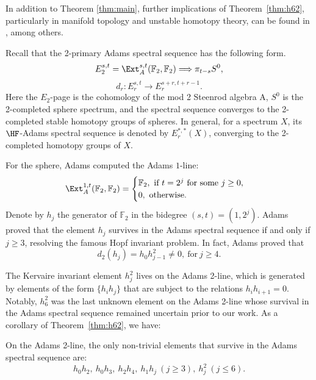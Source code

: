 In addition to Theorem \ref{thm:main}, further implications of Theorem~\ref{thm:h62}, particularly in manifold topology and unstable homotopy theory, can be found in \cite{MillerHHR, MahowaldRemark, HHR, BJMinduction}, among others. 


Recall that the 2-primary Adams spectral sequence has the following form.
$$E_2^{s,t} = \Ext^{s, t}_A(\mathbb{F}_2, \mathbb{F}_2) \Longrightarrow \pi_{t-s} {S^0},$$
$$d_r: E_r^{s,t} \longrightarrow E_r^{s+r, t+r-1}.$$
Here the $E_2$-page is the cohomology of the mod 2 Steenrod algebra A, $S^0$ is the 2-completed sphere spectrum, and the spectral sequence converges to the 2-completed stable homotopy groups of spheres. In general, for a spectrum $X$, its $\HF$-Adams spectral sequence is denoted by $E_r^{*,*}(X)$, converging to the 2-completed homotopy groups of $X$.

For the sphere, Adams \cite{Adams58} computed the Adams $1$-line: 
$$\Ext^{1,t}_A(\mathbb{F}_2, \mathbb{F}_2) = \begin{cases}
 	\mathbb{F}_2, \ \text{if} \ t = 2^j \ \text{for some} \ j \geq 0, \\
 	0, \ \text{otherwise}.
\end{cases}
$$
Denote by $h_j$ the generator of $\mathbb{F}_2$ in the bidegree $(s, t)=(1, 2^j)$. Adams \cite{Adams60} proved that the element $h_j$ survives in the Adams spectral sequence if and only if $j \geq 3$, resolving the famous Hopf invariant problem. In fact, Adams proved that
$$d_2(h_j) = h_0h_{j-1}^2 \neq 0, \ \text{for} \ j \geq 4.$$

The Kervaire invariant element $h_j^2$ lives on the Adams 2-line, which is generated by elements of the form $\{h_ih_j\}$ that are subject to the relations $h_ih_{i+1} = 0$. Notably, $h_6^2$ was the last unknown element on the Adams 2-line whose survival in the Adams spectral sequence remained uncertain prior to our work. As a corollary of Theorem~\ref{thm:h62}, we have:

\begin{corollary} \label{cor:2line}
    On the Adams 2-line, the only non-trivial elements that survive in the Adams spectral sequence are:
    $$h_0h_2, \ h_0h_3, \ h_2h_4, \ h_1h_j \ (j \geq 3), \ h_j^2 \ (j \leq 6).$$
\end{corollary}

